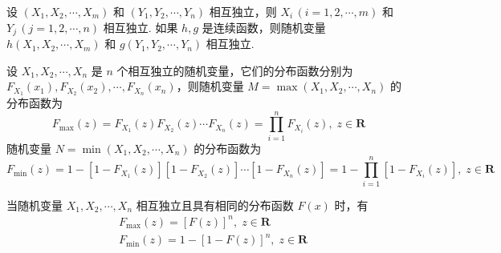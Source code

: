 \begin{conclusion}
    设 $(X_1,X_2,\cdots,X_m)$ 和 $(Y_1,Y_2,\cdots,Y_n)$ 相互独立，则 $X_i \, (i=1,2,\cdots,m)$ 和 $Y_j \, (j=1,2,\cdots,n)$ 相互独立. 如果 $h,g$ 是连续函数，则随机变量 $h(X_1,X_2,\cdots,X_m)$ 和 $g(Y_1,Y_2,\cdots,Y_n)$ 相互独立.
\end{conclusion}

\begin{conclusion}
    设 $X_1,X_2,\cdots,X_n$ 是 $n$ 个相互独立的随机变量，它们的分布函数分别为 $F_{X_1}(x_1), F_{X_2}(x_2), \cdots, F_{X_n}(x_n)$，则随机变量 $M = \max(X_1,X_2,\cdots,X_n)$ 的分布函数为
    $$
    F_{\text{max}}(z) = F_{X_1}(z) F_{X_2}(z) \cdots F_{X_n}(z) = \prod_{i=1}^n F_{X_i}(z), \; z \in \mathbf{R}
    $$
    随机变量 $N = \min(X_1,X_2,\cdots,X_n)$ 的分布函数为
    $$
    F_{\text{min}}(z) = 1-[1-F_{X_1}(z)][1-F_{X_2}(z)] \cdots [1-F_{X_n}(z)] = 1-\prod_{i=1}^n [1-F_{X_i}(z)], \; z \in \mathbf{R}
    $$

    当随机变量 $X_1,X_2,\cdots,X_n$ 相互独立且具有相同的分布函数 $F(x)$ 时，有
    $$
    \begin{aligned}
        & F_{\text{max}}(z) = [F(z)]^n, \; z \in \mathbf{R} \\
        & F_{\text{min}}(z) = 1-[1-F(z)]^n, \; z \in \mathbf{R}
    \end{aligned}
    $$
\end{conclusion}